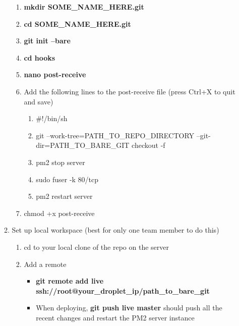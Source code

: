 \documentclass{article}
\begin{document}
\begin{enumerate}
\begin{enumerate}
\begin{enumerate}
      \item \textbf{mkdir SOME\_NAME\_HERE.git}
      \item \textbf{cd SOME\_NAME\_HERE.git}
      \item \textbf{git init --bare}
      \item \textbf{cd hooks}
      \item \textbf{nano post-receive}
      \item Add the following lines to the post-receive file (press Ctrl+X to quit and save)
      \begin{enumerate}
        \item \#!/bin/sh
        \item git --work-tree=PATH\_TO\_REPO\_DIRECTORY --git-dir=PATH\_TO\_BARE\_GIT checkout -f
        \item pm2 stop server
        \item sudo fuser -k 80/tcp
        \item pm2 restart server
      \end{enumerate}
      \item chmod +x post-receive
    \end{enumerate}
    \item Set up local workspace (best for only one team member to do this)
    \begin{enumerate}
      \item cd to your local clone of the repo on the server
      \item Add a remote
      \begin{itemize}
        \item \textbf{git remote add live ssh://root@your\_droplet\_ip/path\_to\_bare\_git}
        \item When deploying, \textbf{git push live master} should push all the recent changes and restart the PM2 server instance
      \end{itemize}
    \end{enumerate}
  \end{enumerate}
\end{enumerate}
\end{document}
